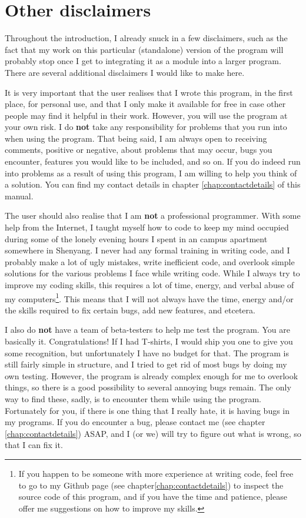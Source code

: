 \documentclass{memoir}
\begin{document}
\section{Other disclaimers}
\label{sec:disclaimers}

Throughout the introduction, I already snuck in a few disclaimers, such as the fact that my work on this particular (standalone) version of the program will probably stop once I get to integrating it as a module into a larger program. There are several additional disclaimers I would like to make here. 

It is very important that the user realises that I wrote this program, in the first place, for personal use, and that I only make it available for free in case other people may find it helpful in their work. However, you will use the program at your own risk. I do \textbf{not} take any responsibility for problems that you run into when using the program. That being said, I am always open to receiving comments, positive or negative, about problems that may occur, bugs you encounter, features you would like to be included, and so on. If you do indeed run into problems as a result of using this program, I am willing to help you think of a solution. You can find my contact details in chapter \ref{chap:contactdetails} of this manual.

The user should also realise that I am \textbf{not} a professional programmer. With some help from the Internet, I taught myself how to code to keep my mind occupied during some of the lonely evening hours I spent in an campus apartment somewhere in Shenyang. I never had any formal training in writing code, and I probably make a lot of ugly mistakes, write inefficient code, and overlook simple solutions for the various problems I face while writing code. While I always try to improve my coding skills, this requires a lot of time, energy, and verbal abuse of my computers\footnote{If you happen to be someone with more experience at writing code, feel free to go to my Github page (see chapter\ref{chap:contactdetails}) to inspect the source code of this program, and if you have the time and patience, please offer me suggestions on how to improve my skills.}. This means that I will not always have the time, energy and/or the skills required to fix certain bugs, add new features, and etcetera.

I also do \textbf{not} have a team of beta-testers to help me test the program. You are basically it. Congratulations! If I had T-shirts, I would ship you one to give you some recognition, but unfortunately I have no budget for that. The program is still fairly simple in structure, and I tried to get rid of most bugs by doing my own testing. However, the program is already complex enough for me to overlook things, so there is a good possibility to several annoying bugs remain. The only way to find these, sadly, is to encounter them while using the program. Fortunately for you, if there is one thing that I really hate, it is having bugs in my programs. If you do encounter a bug, please contact me (see chapter \ref{chap:contactdetails}) ASAP, and I (or we) will try to figure out what is wrong, so that I can fix it.
\end{document}
